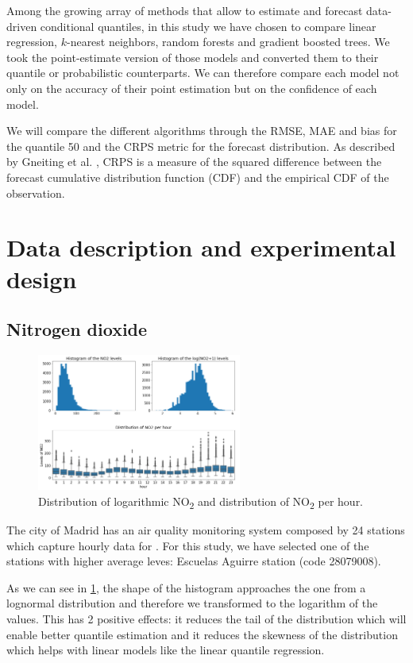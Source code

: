 \documentclass[a4paper,3p,sort&compress]{elsarticle}
\begin{document}
Among the growing array of methods that allow to estimate and forecast
data-driven conditional quantiles, in this study we have chosen to
compare linear regression, $k$-nearest neighbors, random forests and
gradient boosted trees. We took the point-estimate version of those
models and converted them to their quantile or probabilistic
counterparts. We can therefore compare each model not only on the
accuracy of their point estimation but on the confidence of each
model.

We will compare the different algorithms through the RMSE, MAE and
bias for the quantile 50 and the CRPS metric for the forecast
distribution.  As described by Gneiting et
al. \cite{gneiting_probabilistic_2014}, CRPS is a measure of the
squared difference between the forecast cumulative distribution
function (CDF) and the empirical CDF of the observation.

\section{Data description and experimental design}

\subsection{Nitrogen dioxide}
\label{sec:no2}

\begin{figure}
  \centering
  \includegraphics[width=0.6\textwidth]{histo_variance}
  \caption{\label{figure:histo_variance}Distribution of logarithmic
    NO\textsubscript{2} and distribution of NO\textsubscript{2}
    per hour.}
\end{figure}

The city of Madrid has an air quality monitoring system composed by 24
stations which capture hourly data for \no.  For this study, we have
selected one of the stations with higher average leves: Escuelas
Aguirre station (code 28079008).

As we can see in \ref{figure:histo_variance}, the shape of the histogram
approaches the one from a lognormal distribution and therefore we
transformed to the logarithm of the values. This has 2 positive
effects: it reduces the tail of the distribution which will enable
better quantile estimation and it reduces the skewness of the
distribution which helps with linear models like the linear quantile
regression.
\end{document}
